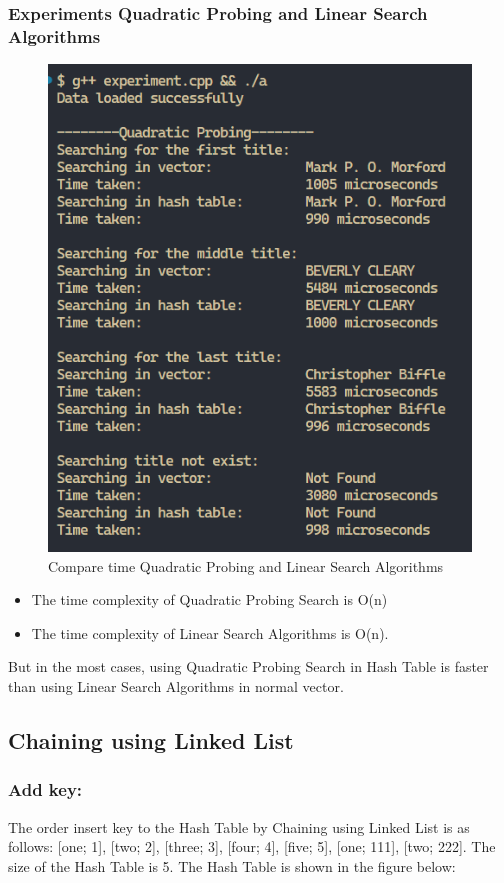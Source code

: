 \subsubsection{Experiments Quadratic Probing and Linear Search Algorithms}
\begin{figure}[H]
	\centering
	\includegraphics[width=0.7\linewidth]{img/Quadratic/compare.PNG}
	\caption{Compare time Quadratic Probing and Linear Search Algorithms}
\end{figure}

\begin{itemize}
	\item The time complexity of Quadratic Probing Search is O(n)
	\item The time complexity of Linear Search Algorithms is O(n).
\end{itemize}
But in the most cases, using Quadratic Probing Search in Hash Table is faster than using Linear Search Algorithms in normal vector.\\

\pagebreak
\subsection{Chaining using Linked List}

\subsubsection{Add key:}
The order insert key to the Hash Table by Chaining using Linked List is as follows: [one; 1], [two; 2], [three; 3], [four; 4], [five; 5], [one; 111], [two; 222]. The size of the Hash Table is 5. The Hash Table is shown in the figure below:

